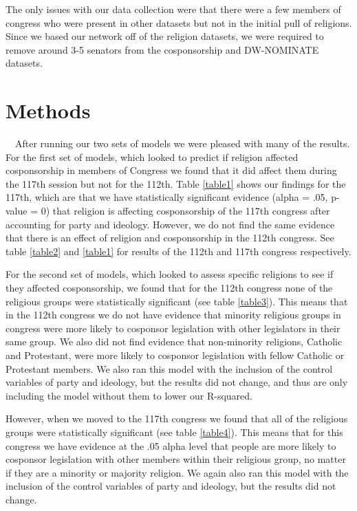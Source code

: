 \documentclass[Royal,times,sageh]{sagej}
\begin{document}
The only issues with our data collection were that there were a few
members of congress who were present in other datasets but not in the
initial pull of religions. Since we based our network off of the
religion datasets, we were required to remove around 3-5 senators from
the cosponsorship and DW-NOMINATE datasets.

\hypertarget{methods}{%
\section{Methods}\label{methods}}

\doublespacing

~~After running our two sets of models we were pleased with many of the
results. For the first set of models, which looked to predict if
religion affected cosponsorship in members of Congress we found that it
did affect them during the 117th session but not for the 112th. Table
\ref{table1} shows our findings for the 117th, which are that we have
statistically significant evidence (alpha = .05, p-value = 0) that
religion is affecting cosponsorship of the 117th congress after
accounting for party and ideology. However, we do not find the same
evidence that there is an effect of religion and cosponsorship in the
112th congress. See table \ref{table2} and \ref{table1} for results of
the 112th and 117th congress respectively.

For the second set of models, which looked to assess specific religions
to see if they affected cosponsorship, we found that for the 112th
congress none of the religious groups were statistically significant
(see table \ref{table3}). This means that in the 112th congress we do
not have evidence that minority religious groups in congress were more
likely to cosponsor legislation with other legislators in their same
group. We also did not find evidence that non-minority religions,
Catholic and Protestant, were more likely to cosponsor legislation with
fellow Catholic or Protestant members. We also ran this model with the
inclusion of the control variables of party and ideology, but the
results did not change, and thus are only including the model without
them to lower our R-squared.

However, when we moved to the 117th congress we found that all of the
religious groups were statistically significant (see table
\ref{table4}). This means that for this congress we have evidence at the
.05 alpha level that people are more likely to cosponsor legislation
with other members within their religious group, no matter if they are a
minority or majority religion. We again also ran this model with the
inclusion of the control variables of party and ideology, but the
results did not change.
\end{document}
